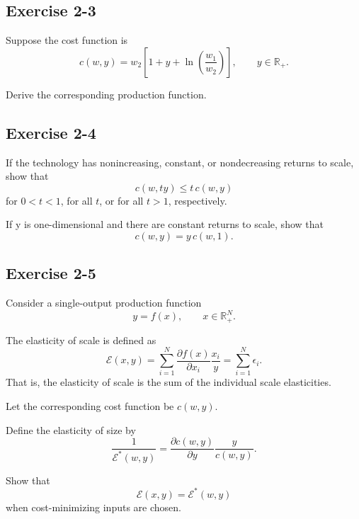 \begin{tcolorbox}[breakable]

\subsection*{Exercise 2-3}

Suppose the cost function is
\[
c(w,y)=w_2\left[1+y+\ln\left(\frac{w_1}{w_2}\right)\right],
\qquad y \in \mathbb{R}_+.
\]

Derive the corresponding production function.

\end{tcolorbox}

\begin{tcolorbox}[breakable]

\subsection*{Exercise 2-4}

If the technology has nonincreasing, constant, or nondecreasing returns to scale,
show that
\[
c(w,ty) \le t\,c(w,y)
\]
for $0<t<1$, for all $t$, or for all $t>1$, respectively.

If y is one-dimensional and there are constant returns to scale, show that
\[
c(w,y)=y\,c(w,1).
\]

\end{tcolorbox}

\begin{tcolorbox}[breakable]

\subsection*{Exercise 2-5}

Consider a single-output production function
\[
y=f(x), \qquad x \in \mathbb{R}_+^N.
\]

The elasticity of scale is defined as
\[
\mathcal{E}(x,y)
=
\sum_{i=1}^N \frac{\partial f(x)}{\partial x_i}\frac{x_i}{y}
=
\sum_{i=1}^N \epsilon_i.
\]
That is, the elasticity of scale is the sum of the individual scale elasticities.

Let the corresponding cost function be $c(w,y)$.

Define the elasticity of size by
\[
\frac{1}{\mathcal{E}^*(w,y)}
=
\frac{\partial c(w,y)}{\partial y}\frac{y}{c(w,y)}.
\]

Show that
\[
\mathcal{E}(x,y)=\mathcal{E}^*(w,y)
\]
when cost-minimizing inputs are chosen.

\end{tcolorbox}




